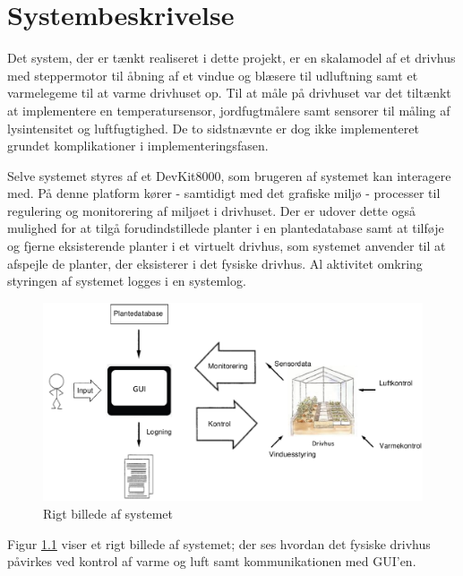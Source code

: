 \chapter{Systembeskrivelse} \label{ch:Systembeskrivelse}

Det system, der er tænkt realiseret i dette projekt, er en skalamodel af et drivhus med steppermotor til åbning af et vindue og blæsere til udluftning samt et varmelegeme til at varme drivhuset op. 
Til at måle på drivhuset var det tiltænkt at implementere en temperatursensor, jordfugtmålere samt sensorer til måling af lysintensitet og luftfugtighed. 
De to sidstnævnte er dog ikke implementeret grundet komplikationer i implementeringsfasen.

Selve systemet styres af et DevKit8000, som brugeren af systemet kan interagere med.
På denne platform kører - samtidigt med det grafiske miljø - processer til regulering og monitorering af miljøet i drivhuset.
Der er udover dette også mulighed for at tilgå forudindstillede planter i en plantedatabase samt at tilføje og fjerne eksisterende planter i et virtuelt drivhus, som systemet anvender til at afspejle de planter, der eksisterer i det fysiske drivhus.
Al aktivitet omkring styringen af systemet logges i en systemlog.

\begin{figure}[h]
\centering
\includegraphics[width=\textwidth]{../fig/Rigt_Billede}
\caption{Rigt billede af systemet}
\label{fig:rigt_billede}
\end{figure}

Figur \ref{fig:rigt_billede} viser et rigt billede af systemet; der ses hvordan det fysiske drivhus påvirkes ved kontrol af varme og luft samt kommunikationen med GUI'en.

\clearpage

